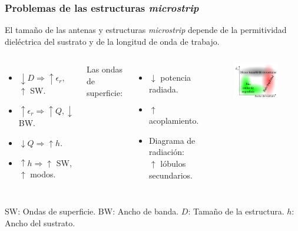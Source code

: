 \documentclass{beamer}
\begin{document}
		\begin{frame}
		\frametitle{Problemas de las estructuras \textit{microstrip}}
			El tamaño de las antenas y estructuras \textit{microstrip} depende de la permitividad dieléctrica del sustrato y de la longitud de onda de trabajo. \\
			\begin{columns}[c] %
				
				
				\begin{itemize}
					\item $\downarrow D \Rightarrow \uparrow \epsilon_r,$ {\color{red}$\uparrow$ SW}.
					\item $\uparrow \epsilon_r \Rightarrow \uparrow Q, \downarrow$ BW.
					\item $\downarrow Q \Rightarrow \uparrow h$.
					\item $\uparrow h \Rightarrow ${\color{red}$\uparrow$ SW}, $\uparrow$ modos.
				\end{itemize}
				\vspace{5pt}
				Las ondas de superficie:
				\begin{itemize}
					\item $\downarrow$ potencia radiada.
					\item {\color{red}$\uparrow$ acoplamiento.}
					\item Diagrama de radiación: \\$\uparrow$ lóbulos secundarios. %
				\end{itemize}
				
				
				\begin{figure}[h]
					\centering
					\includegraphics[width=1\textwidth]{Presentacion/problema_microstrip.pdf}
				\end{figure}
				
			\end{columns}
			\vspace{9pt}
			{\footnotesize SW: Ondas de superficie. BW: Ancho de banda. $D$: Tamaño de la estructura. $h$: Ancho del sustrato.}
		\end{frame}
		
\end{document}
